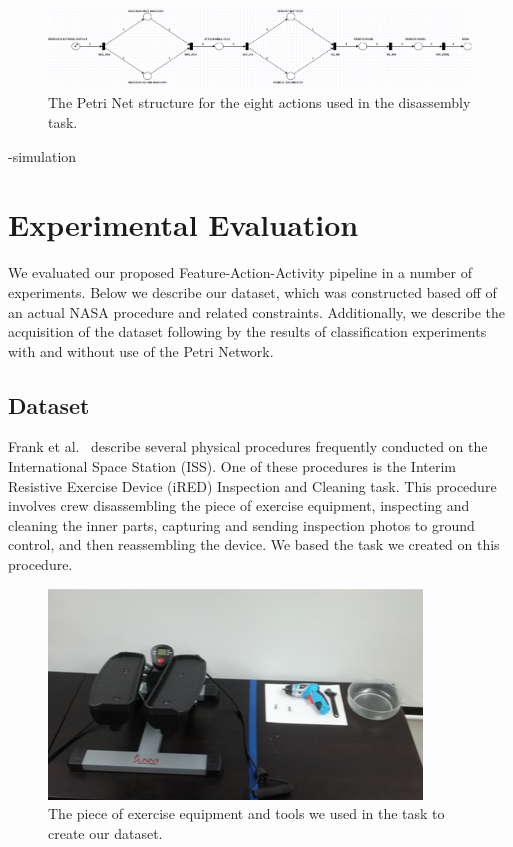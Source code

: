 \documentclass[10pt,twocolumn,letterpaper]{article}
\begin{document}
\begin{figure}[t]
    \centering
    \includegraphics[width=7.1in]{fig/petri.png}
    \caption{The Petri Net structure for the eight actions used in the disassembly task.}
    \label{fig:petri}
\end{figure}


-simulation
\section{Experimental Evaluation}

We evaluated our proposed Feature-Action-Activity pipeline in a number of experiments. Below we describe our dataset, which was constructed based off of an actual NASA procedure and related constraints. Additionally, we describe the acquisition of the dataset following by the results of classification experiments with and without use of the Petri Network.

\subsection{Dataset}

Frank et al.~\cite{frank2013autonomous} describe several physical procedures frequently conducted on the International Space Station (ISS). One of these procedures is the Interim Resistive Exercise Device (iRED) Inspection and Cleaning task. This procedure involves crew disassembling the piece of exercise equipment, inspecting and cleaning the inner parts, capturing and sending inspection photos to ground control, and then reassembling the device. We based the task we created on this procedure.

\begin{figure}[!t]
    \centering
    \includegraphics[width=\columnwidth]{fig/equipment.png}
    \caption{The piece of exercise equipment and tools we used in the task to create our dataset.}
    \label{fig:equipment}
\end{figure}
\end{document}
